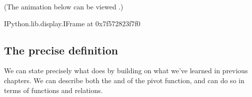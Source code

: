 \documentclass[letterpaper,10pt,english]{jupyterBook}
\begin{document}
\sphinxAtStartPar
(The animation below can be viewed .)

\begin{sphinxVerbatim}[commandchars=\\\{\}]
\PYGZlt{}IPython.lib.display.IFrame at 0x7f572823f7f0\PYGZgt{}
\end{sphinxVerbatim}


\subsection{The precise definition}
\label{\detokenize{chapter-6-single-table-verbs:the-precise-definition}}
\sphinxAtStartPar
We can state precisely what  does by building on what we’ve learned in previous chapters.  We can describe both the  and  of the pivot function, and can do so in terms of functions and relations.
\end{document}
